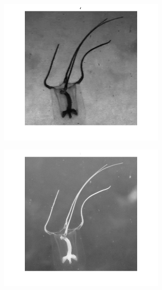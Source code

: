\documentclass{article}
\begin{document}
\begin{figure}[H]
\begin{subfigure}{0.5\textwidth}
	\centering
        \includegraphics[width=0.9\textwidth]{1901-hsi-s.png}
    \end{subfigure}\hfill
	\begin{subfigure}{0.5\textwidth}
	\centering
        \includegraphics[width=0.9\textwidth]{1901-hsi-i.png}
    \end{subfigure}\hfill
	\centering
	\begin{subfigure}{0.5\textwidth}
	\centering

\end{subfigure}
\end{figure}
\end{document}
